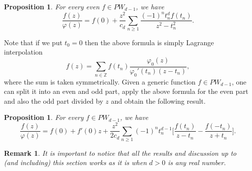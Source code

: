 \documentclass[a4paper,reqno,12pt]{amsart}
\newtheorem{proposition}[theorem]{Proposition}\newtheorem{corollary}[theorem]{Corollary}
\newtheorem{remark}[theorem]{Remark}
\newcommand{\z}{\mathbb{Z}}
\newcommand{\p}{\varphi}
\newcommand{\sign}{{\rm sign}}
\begin{document}
\begin{proposition}\label{prop:eveninterp}
For every even $f\in PW_{d-1}$, we have
$$
\frac{f(z)}{\p(z)} = f(0) +\frac{z^2}{c_d}\sum_{n\geq 1} \frac{(-1)^{n}t_n^{d}f(t_n) }{z^2-t_n^2}.
$$
\end{proposition}



Note that if we put $t_0=0$ then the above formula is simply Lagrange interpolation
$$
f(z)=\sum_{n\in \z} f(t_n)\frac{\p_0(z)}{\p_0'(t_n)(z-t_n)},
$$
where the sum is taken symmetrically. Given a generic function $f\in PW_{d-1}$, one can split it into an even and odd part, apply the above formula for the even part and also the odd part divided by $z$ and obtain the following result.  
 
\begin{proposition}\label{prop:geninterp}
For every $f\in PW_{d-1}$, we have
$$
\frac{f(z)}{\p(z)}  = {f(0)+f'(0)z}+ \frac{z^2}{2c_d}\sum_{n\geq 1}(-1)^n t_n^{d-1}\bigg[\frac{f(t_n)}{z-t_n}-\frac{f(-t_n)}{z+t_n}\bigg].
$$
\end{proposition}

\begin{remark}
It is important to notice that \emph{all} the results and discussion up to (and including) this section works as it is when $d>0$ is any \emph{real} number. 
\end{remark}
\end{document}
